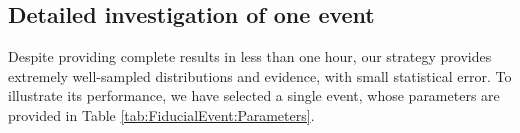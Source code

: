 



\subsection{Detailed investigation of one event}
%    

Despite providing complete results in less than one hour, our strategy provides extremely well-sampled distributions and
evidence, with small statistical error.   To illustrate its performance, we have selected a single event, whose
parameters are provided in Table \ref{tab:FiducialEvent:Parameters}.   
%




